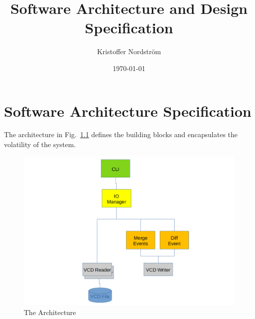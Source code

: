 \documentclass{report}
\begin{document}
\thispagestyle{empty}

\title{Software Architecture and Design Specification}
\author{Kristoffer Nordström}
\date{\today}
\maketitle
\newpage

\tableofcontents

\listoffigures
\listoftables

\newpage

\chapter{Software Architecture Specification}

The architecture in Fig.\ \ref{fig:architecture} defines the building blocks and encapsulates the volatility of the system.

\begin{figure}
  \centering
  \includegraphics[width=1.0\textwidth]{latex/architecture.png}
  \caption{The Architecture}
  \label{fig:architecture}
\end{figure}




\appendix

\end{document}
